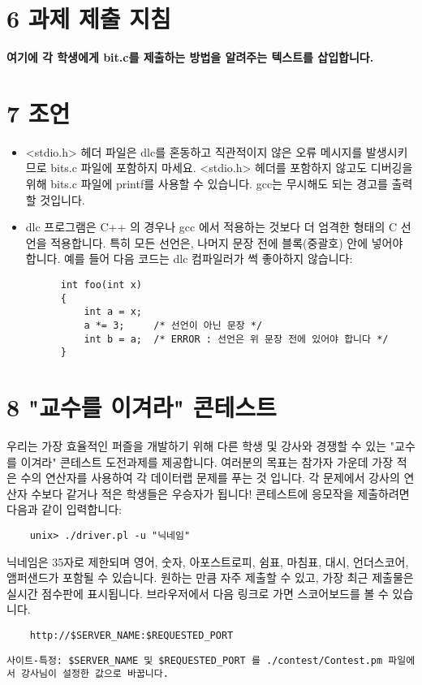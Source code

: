 \documentclass{article}
\begin{document}
\section*{6 과제 제출 지침}
\textbf{여기에 각 학생에게 bit.c를 제출하는 방법을 알려주는 텍스트를 삽입합니다.}

\section*{7 조언}
\begin{itemize}
\item <stdio.h> 헤더 파일은 dlc를 혼동하고 직관적이지 않은 오류 메시지를 발생시키므로 bits.c 파일에 포함하지 마세요. <stdio.h> 헤더를 포함하지 않고도 디버깅을 위해 bits.c 파일에 printf를 사용할 수 있습니다. gcc는 무시해도 되는 경고를 출력할 것입니다.

  \item dlc 프로그램은 C++ 의 경우나 gcc 에서 적용하는 것보다 더 엄격한 형태의 C 선언을 적용합니다. 특히 모든 선언은, 나머지 문장 전에 블록(중괄호) 안에 넣어야 합니다. 예를 들어 다음 코드는 dlc 컴파일러가 썩 좋아하지 않습니다:
  \begin{verbatim}
      int foo(int x)
      {
          int a = x;
          a *= 3;     /* 선언이 아닌 문장 */
          int b = a;  /* ERROR : 선언은 위 문장 전에 있어야 합니다 */
      } 
  \end{verbatim}
\end{itemize}

\section*{8 "교수를 이겨라" 콘테스트}
우리는 가장 효율적인 퍼즐을 개발하기 위해 다른 학생 및 강사와 경쟁할 수 있는 "교수를 이겨라" 콘테스트 도전과제를 제공합니다. 여러분의 목표는 참가자 가운데 가장 적은 수의 연산자를 사용하여 각 데이터랩 문제를 푸는 것 입니다. 각 문제에서 강사의 연산자 수보다 같거나 적은 학생들은 우승자가 됩니다!
\noindent
콘테스트에 응모작을 제출하려면 다음과 같이 입력합니다:
\begin{verbatim}
    unix> ./driver.pl -u "닉네임"
\end{verbatim}  

\noindent
닉네임은 35자로 제한되며 영어, 숫자, 아포스트로피, 쉼표, 마침표, 대시, 언더스코어, 앰퍼샌드가 포함될 수 있습니다. 원하는 만큼 자주 제출할 수 있고, 가장 최근 제출물은 실시간 점수판에 표시됩니다. 브라우저에서 다음 링크로 가면 스코어보드를 볼 수 있습니다.

\begin{verbatim}
    http://$SERVER_NAME:$REQUESTED_PORT
\end{verbatim}

\noindent
\begin{verbatim}사이트-특정: $SERVER_NAME 및 $REQUESTED_PORT 를 ./contest/Contest.pm 파일에서 강사님이 설정한 값으로 바꿉니다.\end{verbatim}
\end{document}
